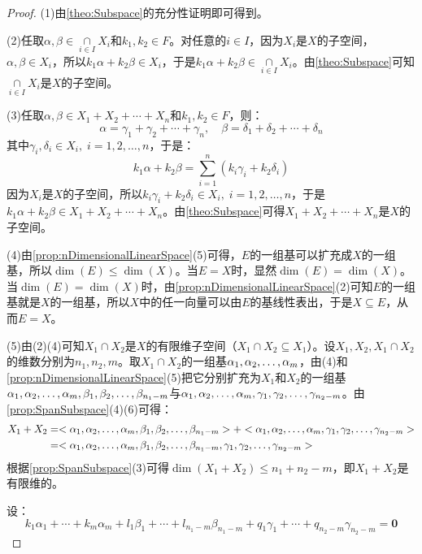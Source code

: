 \begin{proof}
	(1)由\cref{theo:Subspace}的充分性证明即可得到。\par
	(2)任取$\alpha,\beta\in\underset{i\in I}{\overset{}{\cap}}X_i$和$k_1,k_2\in F$。对任意的$i\in I$，因为$X_i$是$X$的子空间，$\alpha,\beta\in X_i$，所以$k_1\alpha+k_2\beta\in X_i$，于是$k_1\alpha+k_2\beta\in\underset{i\in I}{\overset{}{\cap}}X_i$。由\cref{theo:Subspace}可知$\underset{i\in I}{\overset{}{\cap}}X_i$是$X$的子空间。\par
	(3)任取$\alpha,\beta\in X_1+X_2+\cdots+X_n$和$k_1,k_2\in F$，则：
	\begin{equation*}
		\alpha=\gamma_1+\gamma_2+\cdots+\gamma_n,\quad
		\beta=\delta_1+\delta_2+\cdots+\delta_n
	\end{equation*}
	其中$\gamma_i,\delta_i\in X_i,\;i=1,2,\dots,n$，于是：
	\begin{equation*}
		k_1\alpha+k_2\beta=\sum_{i=1}^{n}(k_i\gamma_i+k_2\delta_i)
	\end{equation*}
	因为$X_i$是$X$的子空间，所以$k_i\gamma_i+k_2\delta_i\in X_i,\;i=1,2,\dots,n$，于是$k_1\alpha+k_2\beta\in X_1+X_2+\cdots+X_n$。由\cref{theo:Subspace}可得$X_1+X_2+\cdots+X_n$是$X$的子空间。\par
	(4)由\cref{prop:nDimensionalLinearSpace}(5)可得，$E$的一组基可以扩充成$X$的一组基，所以$\dim(E)\leqslant\dim(X)$。当$E=X$时，显然$\dim(E)=\dim(X)$。当$\dim(E)=\dim(X)$时，由\cref{prop:nDimensionalLinearSpace}(2)可知$E$的一组基就是$X$的一组基，所以$X$中的任一向量可以由$E$的基线性表出，于是$X\subseteq E$，从而$E=X$。\par
	(5)由(2)(4)可知$X_1\cap X_2$是$X$的有限维子空间（$X_1\cap X_2\subseteq X_1$）。设$X_1,X_2,X_1\cap X_2$的维数分别为$n_1,n_2,m$。取$X_1\cap X_2$的一组基$\alpha_1, \alpha_2, \dots, \alpha_{m}$，由(4)和\cref{prop:nDimensionalLinearSpace}(5)把它分别扩充为$X_1$和$X_2$的一组基$\alpha_1, \alpha_2, \dots, \alpha_{m},\beta_1, \beta_2, \dots, \beta_{n_1-m}$与$\alpha_1, \alpha_2, \dots, \alpha_{m},\gamma_1, \gamma_2, \dots, \gamma_{n_2-m}$。由\cref{prop:SpanSubspace}(4)(6)可得：
	\begin{align*}
		X_1+X_2
		&=<\alpha_1, \alpha_2, \dots, \alpha_{m},\beta_1, \beta_2, \dots, \beta_{n_1-m}>+<\alpha_1, \alpha_2, \dots, \alpha_{m},\gamma_1, \gamma_2, \dots, \gamma_{n_2-m}> \\
		&=<\alpha_1, \alpha_2, \dots, \alpha_{m},\beta_1, \beta_2, \dots, \beta_{n_1-m},\gamma_1, \gamma_2, \dots, \gamma_{n_2-m}>
	\end{align*}
	根据\cref{prop:SpanSubspace}(3)可得$\operatorname{dim}(X_1+X_2)\leqslant n_1+n_2-m$，即$X_1+X_2$是有限维的。\par
	设：
	\begin{equation*}
		k_1\alpha_1+\cdots+k_m\alpha_m+l_1\beta_1+\cdots+l_{n_1-m}\beta_{n_1-m}+q_1\gamma_1+\cdots+q_{n_2-m}\gamma_{n_2-m}=\mathbf{0}

\end{equation*}
\end{proof}
